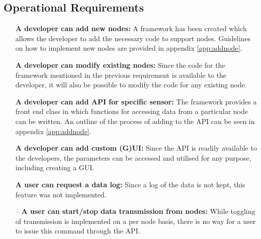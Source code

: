 \subsection{Operational Requirements}
\begin{itemize}
	\item[\cmark] \textbf{A developer can add new nodes:}
	A framework has been created which allows the developer to add the necessary code to support nodes.
	Guidelines on how to implement new nodes are provided in appendix \ref{app:addnode}.
	\item[\cmark] \textbf{A developer can modify existing nodes:}
	Since the code for the framework mentioned in the previous requirement is available to the developer, it will also be possible to modify the code for any existing node.
	\item[\cmark] \textbf{A developer can add API for specific sensor:}
	The framework provides a front end class in which functions for accessing data from a particular node can be written.
	An outline of the process of adding to the API can be seen in appendix \ref{app:addnode}.
	\item[\cmark] \textbf{A developer can add custom (G)UI:}
	Since the API is readily available to the developers, the parameters can be accessed and utilised for any purpose, including creating a GUI.
	\item[\xmark] \textbf{A user can request a data log:}
	Since a log of the data is not kept, this feature was not implemented.
	\item[--] \textbf{A user can start/stop data transmission from nodes:}
	While toggling of transmission is implemented on a per node basis, there is no way for a user to issue this command through the API.
\end{itemize}

